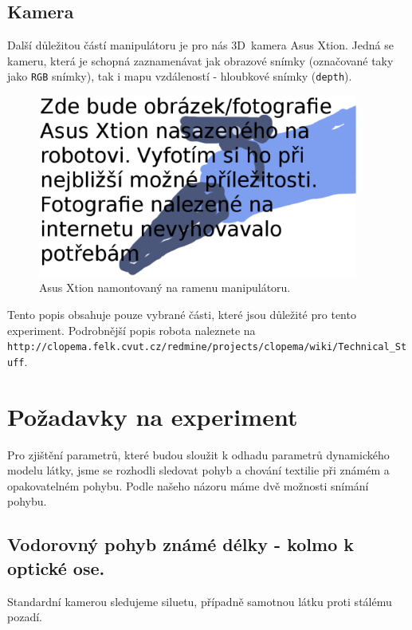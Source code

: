 \documentclass[10pt,a4paper,titlepage,oneside]{report}
\begin{document}
\subsection{Kamera}
\label{subsec:camera}
Další důležitou částí manipulátoru je pro nás 3D~kamera Asus Xtion. Jedná se kameru, která je schopná zaznamenávat jak obrazové snímky (označované taky jako \verb|RGB| snímky), tak i mapu vzdáleností - hloubkové snímky (\verb|depth|). 


\begin{figure}[H]
	\centering  	
  	\includegraphics[height=6cm]{pictures/xtion.eps}
  	\caption[]{Asus Xtion namontovaný na ramenu manipulátoru.  	
  	}
  	\label{fig:xtion}
\end{figure}

\noindent Tento popis obsahuje pouze vybrané části, které jsou důležité pro tento experiment. Podrobnější popis robota naleznete na \verb|http://clopema.felk.cvut.cz/redmine/projects/clopema/wiki/Technical_Stuff|. \\




\newpage

\section{Požadavky na experiment}
\label{sec:experiment}
Pro zjištění parametrů, které budou sloužit k odhadu parametrů dynamického modelu látky, jsme se rozhodli sledovat pohyb a chování textilie při známém a opakovatelném pohybu. 
Podle našeho názoru máme dvě možnosti snímání pohybu.

\subsection{Vodorovný pohyb známé délky - kolmo k optické ose.}
Standardní kamerou sledujeme siluetu, případně samotnou látku proti stálému pozadí.
\end{document}
